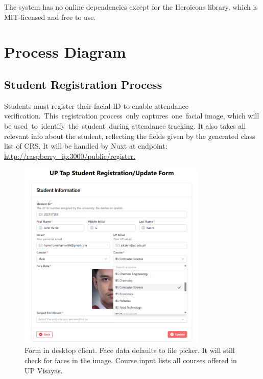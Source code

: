 The system has no online dependencies except for the Heroicons library, which is MIT-licensed and free to use.

\section{Process Diagram}

\subsection{Student Registration Process}
Students must register their facial ID to enable attendance verification. This registration process only captures one facial image, which will be used to identify the student during attendance tracking. It also takes all relevant info about the student, reflecting the fields given by the generated class list of CRS. It will be handled by Nuxt at endpoint: \url{http://raspberry_ip:3000/public/register. }
\begin{figure}[h] %
	\centering
	\includegraphics[width=0.8\textwidth]{figures/chapter4/student_form_pc.png} %
	\caption{Form in desktop client. Face data defaults to file picker. It will still check for faces in the image. Course input lists all courses offered in UP Visayas.}
	\label{fig:student_form_pc}
\end{figure}
\clearpage

